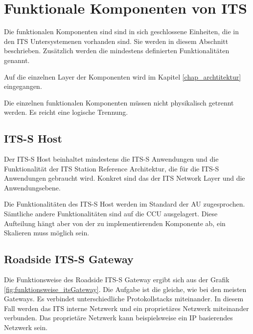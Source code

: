 \section{Funktionale Komponenten von ITS \label{funktionsweise_funktionaleKomponenten}}
Die funktionalen Komponenten sind sind in sich geschlossene Einheiten, die in den \ac{ITS} Untersystemenen vorhanden sind. Sie werden in diesem Abschnitt beschrieben. Zusätzlich werden die mindestens definierten Funktionalitäten genannt.

Auf die einzelnen Layer der Komponenten wird im Kapitel \ref{chap_archtitektur} eingegangen.   

Die einzelnen funktionalen Komponenten müssen nicht physikalisch getrennt werden. Es reicht eine logische Trennung.  

\subsection{ITS-S Host \label{funktionsweise_ITSHost}}
Der ITS-S Host beinhaltet mindestens die ITS-S Anwendungen und die Funktionalität der ITS  Station Reference Architektur, die für die  ITS-S Anwendungen gebraucht wird. Konkret sind das der \ac{ITS} Network Layer und die Anwendungsebene. 

Die Funktionalitäten des ITS-S Host werden im Standard \cite{etsi302636-3} der \ac{AU} zugesprochen. Sämtliche andere Funktionalitäten sind auf die \ac{CCU} ausgelagert. Diese Aufteilung hängt aber von der zu implementierenden Komponente ab, ein Skalieren muss möglich sein.

\subsection{Roadside ITS-S Gateway \label{funktionsweise_RoadsideITSGateway}}
Die Funktionsweise des Roadside ITS-S Gateway ergibt sich aus der Grafik \ref{fig:funktionsweise_itsGateway}. Die Aufgabe ist die gleiche, wie bei den meisten Gateways. Es verbindet unterschiedliche Protokollstacks miteinander. In diesem Fall werden das \ac{ITS} interne Netzwerk und ein proprietäres Netzwerk miteinander verbunden. Das proprietäre Netzwerk kann beispielsweise ein IP basierendes Netzwerk sein.

